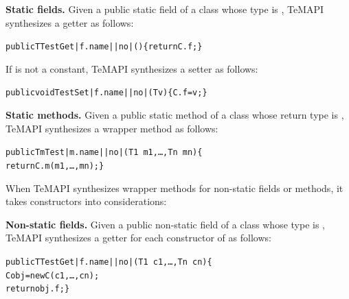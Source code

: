 \textbf{Static fields.} Given a public static field  of a class  whose type is , TeMAPI synthesizes a getter as follows:

\begin{CodeOut}\vspace*{-1ex}
\begin{alltt}
 public T TestGet|f.name||no|()\{ return C.f; \}
\end{alltt}
\end{CodeOut}\vspace*{-1ex}

If  is not a constant, TeMAPI synthesizes a setter as follows:

\begin{CodeOut}\vspace*{-1ex}
\begin{alltt}
 public void TestSet|f.name||no|(T v)\{ C.f = v; \}
\end{alltt}
\end{CodeOut}\vspace*{-1ex}

\textbf{Static methods.} Given a public static method  of a class  whose return type is , TeMAPI synthesizes a wrapper method as follows:

\begin{CodeOut}\vspace*{-1ex}
\begin{alltt}
 public Tm Test|m.name||no|(T1\ m1,\ldots, Tn\ mn)\{
   return C.m(m1,\ldots, mn); \}
\end{alltt}
\end{CodeOut}\vspace*{-1ex}

When TeMAPI synthesizes wrapper methods for non-static fields or methods, it takes constructors into considerations:

\textbf{Non-static fields.} Given a public non-static field  of a class  whose type is , TeMAPI synthesizes a getter for each constructor  of  as follows:

\begin{CodeOut}\vspace*{-1ex}
\begin{alltt}
 public T TestGet|f.name||no|(T1\ c1,\ldots, Tn\ cn)\{
    C obj = new C(c1,\ldots, cn);
    return obj.f; \}
\end{alltt}
\end{CodeOut}\vspace*{-1ex}

